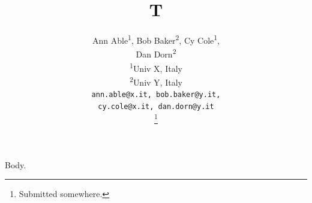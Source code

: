 \documentclass[12pt,onecolumn]{IEEEtran}
\begin{document}
\title{T}
\author{
Ann Able\textsuperscript{1}, Bob Baker\textsuperscript{2}, Cy Cole\textsuperscript{1}, \\
Dan Dorn\textsuperscript{2} \\[1em]
\textsuperscript{1}Univ X, Italy \\
\textsuperscript{2}Univ Y, Italy \\[1em]
\texttt{ann.able@x.it, bob.baker@y.it,}\\
\texttt{cy.cole@x.it, dan.dorn@y.it}


\thanks{Submitted somewhere.}
}
\maketitle
Body.
\end{document}

